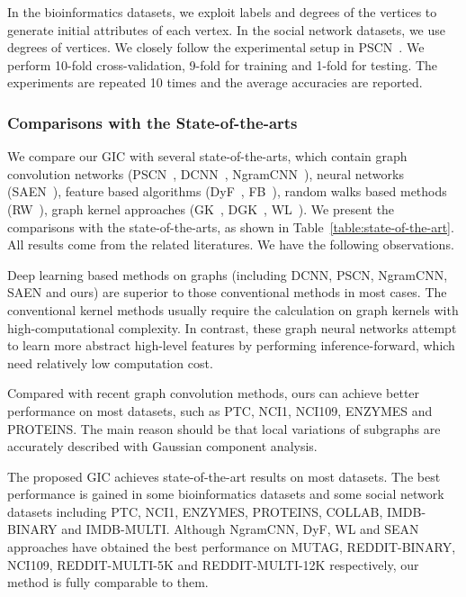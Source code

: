 \documentclass[letterpaper]{article} \usepackage{aaai19}  \usepackage{times}  \usepackage{helvet}  \usepackage{courier}  \usepackage{url}  \usepackage{graphicx}  \frenchspacing  \setlength{\pdfpagewidth}{8.5in}  \setlength{\pdfpageheight}{11in}
\begin{document}
In the bioinformatics datasets, we exploit labels and degrees of the vertices to generate initial attributes of each vertex. In the social network datasets, we use degrees of vertices. We closely follow the experimental setup in PSCN~\cite{niepert2016learning}. We perform 10-fold cross-validation, 9-fold for training and 1-fold for testing. The experiments are repeated 10 times and the average accuracies are reported.


\subsubsection{Comparisons with the State-of-the-arts}

We compare our GIC with several state-of-the-arts, which contain graph convolution networks (PSCN~\cite{niepert2016learning}, DCNN~\cite{atwood2016diffusion}, NgramCNN~\cite{luo2017deep}), neural networks (SAEN~\cite{orsini2017shift}), feature based algorithms (DyF~\cite{gomez2017dynamics}, FB~\cite{bruna2013spectral}), random walks based methods (RW~\cite{gartner2003graph}), graph kernel approaches (GK~\cite{shervashidze2009efficient}, DGK~\cite{yanardag2015deep}, WL~\cite{morris2017glocalized}). We present the comparisons with the state-of-the-arts, as shown in Table~\ref{table:state-of-the-art}. All results come from the related literatures. We have the following observations.

Deep learning based methods on graphs (including DCNN, PSCN, NgramCNN, SAEN and ours) are superior to those conventional methods in most cases. The conventional kernel methods usually require the calculation on graph kernels with high-computational complexity. In contrast, these graph neural networks attempt to learn more abstract high-level features by performing inference-forward, which need relatively low computation cost.

Compared with recent graph convolution methods, ours can achieve better performance on most datasets, such as PTC, NCI1, NCI109, ENZYMES and PROTEINS. The main reason should be that local variations of subgraphs are accurately described with Gaussian component analysis.

The proposed GIC achieves state-of-the-art results on most datasets. The best performance is gained in some bioinformatics datasets and some social network datasets including PTC, NCI1, ENZYMES, PROTEINS, COLLAB, IMDB-BINARY and IMDB-MULTI. Although NgramCNN, DyF, WL and SEAN approaches have obtained the best performance on MUTAG, REDDIT-BINARY, NCI109, REDDIT-MULTI-5K and REDDIT-MULTI-12K respectively, our method is fully comparable to them.
\end{document}
